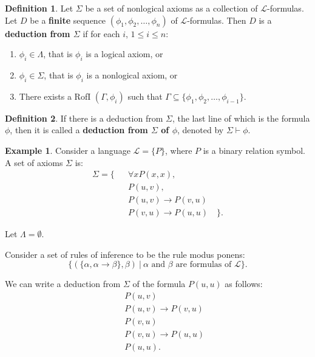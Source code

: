 \documentclass[11pt,letterpaper]{book}
\theoremstyle{definition}
\newtheorem{definition}{Definition}[section]
\newtheorem{example}{Example}[section]
\begin{document}
\begin{definition}\label{def:formulas_deduction_from}
Let $\Sigma$ be a set of nonlogical axioms as a collection of
$\mathcal{L}$-formulas. Let $D$ be a
\textbf{finite} sequence $(\phi_1, \phi_2, \ldots, \phi_n)$ of
$\mathcal{L}$-formulas. Then $D$ is a \textbf{deduction from $\Sigma$}
if for each $i$, $1 \leq i \leq n$:
\begin{enumerate}
\item{$\phi_i \in \Lambda$, that is $\phi_i$ is a logical axiom, or}
\item{$\phi_i \in \Sigma$, that is $\phi_i$ is a nonlogical axiom, or}
\item{There exists a RofI $(\Gamma, \phi_i)$ such that
$\Gamma \subseteq \{ \phi_1, \phi_2, \ldots, \phi_{i-1} \}$.}
\end{enumerate}
\end{definition}

\begin{definition}
If there is a deduction from $\Sigma$, the last line of which is the
formula $\phi$, then it is called a \textbf{deduction from $\Sigma$ of
$\phi$}, denoted by $\Sigma \vdash \phi$.
\end{definition}

\begin{example}\label{example:simple_axioms_reference}
Consider a language $\mathcal{L} = \{ P \}$, where $P$ is a binary
relation symbol. A set of axioms $\Sigma$ is:
\begin{eqnarray*}
\Sigma = \{ & & \forall x P(x, x) , \\
               & & P(u,v), \\
               & & P(u,v) \rightarrow P(v,u)\\
               & & P(v,u) \rightarrow P(u,u) \quad \}.
\end{eqnarray*}

Let $\Lambda = \emptyset$.

Consider a set of rules of inference to be the rule modus ponens:
$$ \{ ( \{ \alpha, \alpha \rightarrow \beta \}, \beta ) \ | \ \alpha
\mbox{ and } \beta \mbox{ are formulas of } \mathcal{L} \}. $$

We can write a deduction from $\Sigma$ of the formula $P(u,u)$ as follows:
\begin{eqnarray*}
& & P(u,v) \\
& & P(u,v) \rightarrow P(v,u) \\
& & P(v,u) \\
& & P(v,u) \rightarrow P(u,u) \\
& & P(u,u).
\end{eqnarray*}

\end{example}
\end{document}
